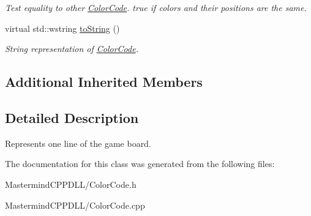 \begin{DoxyCompactItemize}
\begin{DoxyCompactList}\small\item\em Test equality to other \hyperlink{classmastermind_1_1_color_code}{Color\+Code}. true if colors and their positions are the same. \end{DoxyCompactList}\item 
\hypertarget{classmastermind_1_1_color_code_ab691b25cad85b9a895f1e8509cf77556}{}\label{classmastermind_1_1_color_code_ab691b25cad85b9a895f1e8509cf77556} 
virtual std\+::wstring \hyperlink{classmastermind_1_1_color_code_ab691b25cad85b9a895f1e8509cf77556}{to\+String} ()
\begin{DoxyCompactList}\small\item\em String representation of \hyperlink{classmastermind_1_1_color_code}{Color\+Code}. \end{DoxyCompactList}\end{DoxyCompactItemize}
\subsection*{Additional Inherited Members}


\subsection{Detailed Description}
Represents one line of the game board. 

The documentation for this class was generated from the following files\+:\begin{DoxyCompactItemize}
\item 
Mastermind\+C\+P\+P\+D\+L\+L/Color\+Code.\+h\item 
Mastermind\+C\+P\+P\+D\+L\+L/Color\+Code.\+cpp\end{DoxyCompactItemize}
